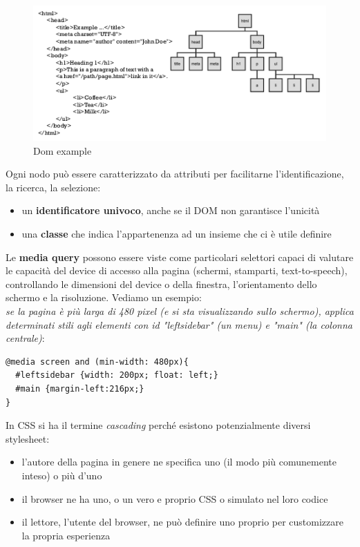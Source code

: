\message{ !name(sd.tex)}\documentclass[a4paper,12pt, oneside]{book}
\begin{document}
\begin{figure}
    \caption{Dom example}
    \label{dom:example}
	\includegraphics[scale=0.9]{img/dom.png}
\end{figure}
Ogni nodo può essere caratterizzato da attributi per facilitarne l'identificazione, la ricerca, la selezione:
\begin{itemize}
	\item un \textbf{identificatore univoco}, anche se il DOM non garantisce l'unicità
	\item una \textbf{classe} che indica l'appartenenza ad un insieme che ci è utile definire
\end{itemize}
Le \textbf{media query} possono essere viste come particolari selettori capaci di valutare le capacità
del device di accesso alla pagina (schermi, stamparti, text-to-speech), controllando le dimensioni
del device o della finestra, l'orientamento dello schermo e la risoluzione.
Vediamo un esempio:\\
\textit{se la pagina è più larga di 480
	pixel (e si sta visualizzando sullo schermo), applica
	determinati stili agli elementi con id "leftsidebar" (un menu) e "main" (la colonna centrale)}:
\begin{verbatim}
@media screen and (min-width: 480px){
  #leftsidebar {width: 200px; float: left;}
  #main {margin-left:216px;}
}
\end{verbatim}
In CSS si ha il termine \textit{cascading} perché esistono potenzialmente diversi stylesheet:
\begin{itemize}
	\item l'autore della pagina in genere ne specifica uno (il modo più comunemente inteso) o più d'uno
	\item il browser ne ha uno, o un vero e proprio CSS o simulato nel loro codice
	\item il lettore, l’utente del browser, ne può definire uno proprio per customizzare la propria esperienza
\end{itemize}
\end{document}
